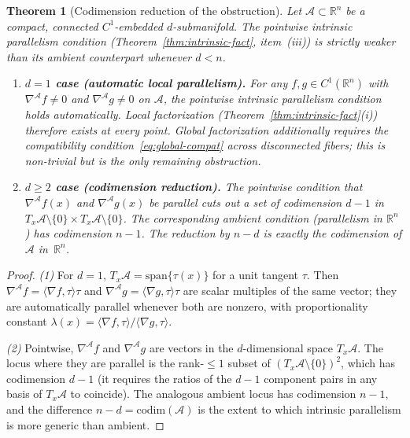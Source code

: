 \documentclass{article}
\newtheorem{theorem}{Theorem}
\begin{document}
\begin{theorem}[Codimension reduction of the obstruction]
\label{thm:codim}
Let $\mathcal{A}\subset\mathbb{R}^n$ be a compact, connected $C^1$-embedded $d$-submanifold. The pointwise intrinsic parallelism condition (Theorem~\ref{thm:intrinsic-fact}, item~(iii)) is strictly weaker than its ambient counterpart whenever $d<n$.
\begin{enumerate}
  \item \textbf{$d=1$ case (automatic local parallelism).}
    For any $f, g\in C^1(\mathbb{R}^n)$ with
    $\nabla^{\!\mathcal{A}} f \neq 0$ and $\nabla^{\!\mathcal{A}} g \neq 0$
    on $\mathcal{A}$, the pointwise intrinsic parallelism condition holds
    automatically. Local factorization (Theorem~\ref{thm:intrinsic-fact}(i))
    therefore exists at every point. Global factorization additionally
    requires the compatibility condition~\eqref{eq:global-compat} across
    disconnected fibers; this is non-trivial but is the only remaining
    obstruction.
  \item \textbf{$d\ge 2$ case (codimension reduction).}
    The pointwise condition that $\nabla^{\!\mathcal{A}} f(x)$ and
    $\nabla^{\!\mathcal{A}} g(x)$ be parallel cuts out a
    set of codimension $d-1$ in
    $T_x\mathcal{A}\setminus\{0\} \times T_x\mathcal{A}\setminus\{0\}$.
    The corresponding ambient condition (parallelism in $\mathbb{R}^n$)
    has codimension $n-1$. The reduction by $n-d$ is exactly the
    codimension of $\mathcal{A}$ in~$\mathbb{R}^n$.
\end{enumerate}
\end{theorem}

\begin{proof}
\textit{(1)} For $d=1$, $T_x\mathcal{A}=\mathrm{span}\{\tau(x)\}$ for a
unit tangent $\tau$. Then $\nabla^{\!\mathcal{A}} f =
\langle\nabla f,\tau\rangle\tau$ and $\nabla^{\!\mathcal{A}} g =
\langle\nabla g,\tau\rangle\tau$ are scalar multiples of the same vector;
they are automatically parallel whenever both are nonzero, with
proportionality constant
$\lambda(x) = \langle\nabla f,\tau\rangle/\langle\nabla g,\tau\rangle$.

\textit{(2)} Pointwise, $\nabla^{\!\mathcal{A}} f$ and
$\nabla^{\!\mathcal{A}} g$ are vectors in the $d$-dimensional space
$T_x\mathcal{A}$. The locus where they are parallel is the rank-$\le 1$
subset of $(T_x\mathcal{A}\setminus\{0\})^2$, which has codimension $d-1$
(it requires the ratios of the $d-1$ component pairs in any basis of
$T_x\mathcal{A}$ to coincide). The analogous ambient locus has codimension
$n-1$, and the difference $n-d = \mathrm{codim}(\mathcal{A})$ is the
extent to which intrinsic parallelism is more generic than ambient.
\end{proof}
\end{document}
